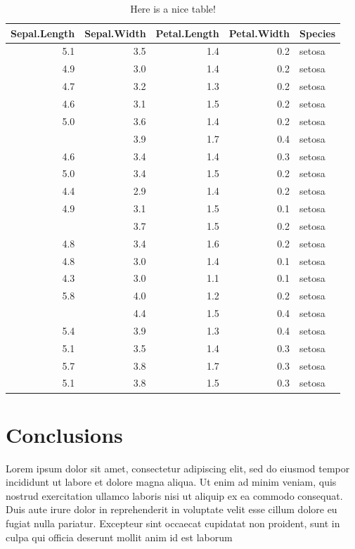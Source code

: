 \begin{table}[t]

\caption{\label{tab:tab1}Here is a nice table!}
\centering
\begin{tabular}{rrrrl}
\toprule
Sepal.Length & Sepal.Width & Petal.Length & Petal.Width & Species\\
\midrule
5.1 & 3.5 & 1.4 & 0.2 & setosa\\
4.9 & 3.0 & 1.4 & 0.2 & setosa\\
4.7 & 3.2 & 1.3 & 0.2 & setosa\\
4.6 & 3.1 & 1.5 & 0.2 & setosa\\
5.0 & 3.6 & 1.4 & 0.2 & setosa\\
\addlinespace
5.4 & 3.9 & 1.7 & 0.4 & setosa\\
4.6 & 3.4 & 1.4 & 0.3 & setosa\\
5.0 & 3.4 & 1.5 & 0.2 & setosa\\
4.4 & 2.9 & 1.4 & 0.2 & setosa\\
4.9 & 3.1 & 1.5 & 0.1 & setosa\\
\addlinespace
5.4 & 3.7 & 1.5 & 0.2 & setosa\\
4.8 & 3.4 & 1.6 & 0.2 & setosa\\
4.8 & 3.0 & 1.4 & 0.1 & setosa\\
4.3 & 3.0 & 1.1 & 0.1 & setosa\\
5.8 & 4.0 & 1.2 & 0.2 & setosa\\
\addlinespace
5.7 & 4.4 & 1.5 & 0.4 & setosa\\
5.4 & 3.9 & 1.3 & 0.4 & setosa\\
5.1 & 3.5 & 1.4 & 0.3 & setosa\\
5.7 & 3.8 & 1.7 & 0.3 & setosa\\
5.1 & 3.8 & 1.5 & 0.3 & setosa\\
\bottomrule
\end{tabular}
\end{table}

\hypertarget{conclusions}{%
\chapter{Conclusions}\label{conclusions}}

Lorem ipsum dolor sit amet, consectetur adipiscing elit, sed do eiusmod tempor incididunt ut labore et dolore magna aliqua. Ut enim ad minim veniam, quis nostrud exercitation ullamco laboris nisi ut aliquip ex ea commodo consequat. Duis aute irure dolor in reprehenderit in voluptate velit esse cillum dolore eu fugiat nulla pariatur. Excepteur sint occaecat cupidatat non proident, sunt in culpa qui officia deserunt mollit anim id est laborum

